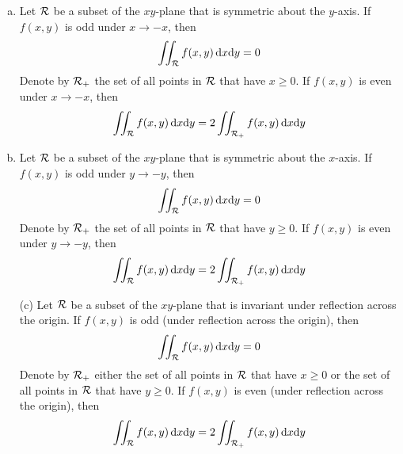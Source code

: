 \begin{theorem}\label{thm:INTevenodd2d}
\begin{enumerate}[(a)]
\item 
Let $\mathcal{R}$ be a subset of the $xy$-plane that is symmetric about the $y$-axis.
If $f(x,y)$ is odd under $x\rightarrow -x$, then
\begin{align*}
\iint_{\mathcal{R}} f(x,y)\,\mathrm{d}x\mathrm{d}y = 0
\end{align*}
Denote by $\mathcal{R}_+$ the set of all points in $\mathcal{R}$ that have $x\ge 0$.
If $f(x,y)$ is even under $x\rightarrow -x$, then
\begin{align*}
\iint_{\mathcal{R}} f(x,y)\,\mathrm{d}x\mathrm{d}y = 2\iint_{\mathcal{R}_+} f(x,y)\,\mathrm{d}x\mathrm{d}y
\end{align*}
 

\item 
Let $\mathcal{R}$ be a subset of the $xy$-plane that is symmetric about the $x$-axis.
 If $f(x,y)$ is odd under $y\rightarrow -y$, then
\begin{align*}
\iint_{\mathcal{R}} f(x,y)\,\mathrm{d}x\mathrm{d}y = 0
\end{align*}
Denote by $\mathcal{R}_+$ the set of all points in $\mathcal{R}$ that have $y\ge 0$.
If $f(x,y)$ is even under $y\rightarrow -y$, then
\begin{align*}
\iint_{\mathcal{R}} f(x,y)\,\mathrm{d}x\mathrm{d}y = 2\iint_{\mathcal{R}_+} f(x,y)\,\mathrm{d}x\mathrm{d}y
\end{align*}
\item[(c)]
Let $\mathcal{R}$ be a subset of the $xy$-plane that is invariant under reflection across the origin.
If $f(x,y)$ is odd (under reflection across the origin), then
\begin{align*}
\iint_{\mathcal{R}} f(x,y)\,\mathrm{d}x\mathrm{d}y = 0
\end{align*}
Denote by $\mathcal{R}_+$ either the set of all points in $\mathcal{R}$ that have $x\ge 0$
or the set of all points in $\mathcal{R}$ that have $y\ge 0$.
If $f(x,y)$ is even (under reflection across the origin), then
\begin{align*}
\iint_{\mathcal{R}} f(x,y)\,\mathrm{d}x\mathrm{d}y = 2\iint_{\mathcal{R}_+} f(x,y)\,\mathrm{d}x\mathrm{d}y
\end{align*}

\end{enumerate}
\end{theorem}

